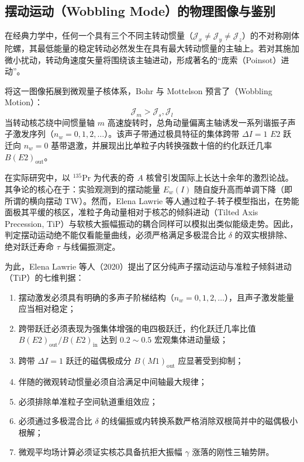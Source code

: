 \subsection{摆动运动（Wobbling Mode）的物理图像与鉴别}

在经典力学中，任何一个具有三个不同主转动惯量（$\mathcal{J}_x \ne \mathcal{J}_y \ne \mathcal{J}_z$）的不对称刚体陀螺，其最低能量的稳定转动必然发生在具有最大转动惯量的主轴上。若对其施加微小扰动，转动角速度矢量将围绕该主轴进动，形成著名的“庞索（Poinsot）进动”。

将这一图像拓展到微观量子核体系，Bohr 与 Mottelson 预言了（Wobbling Motion）：
\begin{equation}
    \mathcal{J}_m > \mathcal{J}_s, \mathcal{J}_l
\end{equation}
当转动核芯绕中间惯量轴 $m$ 高速旋转时，总角动量偏离主轴诱发一系列谐振子声子激发序列（$n_w = 0, 1, 2, \dots$）。该声子带通过极具特征的集体跨带 $\Delta I = 1$ $E2$ 跃迁向 $n_w=0$ 基带退激，并展现出比单粒子内转换强数十倍的约化跃迁几率 $B(E2)_{\text{out}}$。

在实际研究中，以 $^{135}\text{Pr}$ 为代表的奇 $A$ 核曾引发国际上长达十余年的激烈论战。其争论的核心在于：实验观测到的摆动能量 $E_w(I)$ 随自旋升高而单调下降（即所谓的横向摆动 TW）。然而，Elena Lawrie 等人通过粒子-转子模型指出，在势能面极其平缓的核区，准粒子角动量相对于核芯的倾斜进动（Tilted Axis Precession, TiP）与软核大振幅振动的耦合同样可以模拟出类似能级走势。因此，判定摆动运动绝不能仅看能量曲线，必须严格满足多极混合比 $\delta$ 的双实根排除、绝对跃迁寿命 $\tau$ 与线偏振测定。

为此，Elena Lawrie 等人（2020）提出了区分纯声子摆动运动与准粒子倾斜进动（TiP）的七维判据：
\begin{enumerate}
    \item 摆动激发必须具有明确的多声子阶梯结构（$n_w = 0, 1, 2, \dots$），且声子激发能量应当相对稳定；
    \item 跨带跃迁必须表现为强集体增强的电四极跃迁，约化跃迁几率比值 $B(E2)_{\text{out}}/B(E2)_{\text{in}}$ 达到 $0.2 \sim 0.5$ 宏观集体进动量级；
    \item 跨带 $\Delta I = 1$ 跃迁的磁偶极成分 $B(M1)_{\text{out}}$ 应显著受到抑制；
    \item 伴随的微观转动惯量必须自洽满足中间轴最大规律；
    \item 必须排除单准粒子空间轨道重组效应；
    \item 必须通过多极混合比 $\delta$ 的线偏振或内转换系数严格消除双根简并中的磁偶极小根解；
    \item 微观平均场计算必须证实核芯具备抗拒大振幅 $\gamma$ 涨落的刚性三轴势阱。
\end{enumerate}

